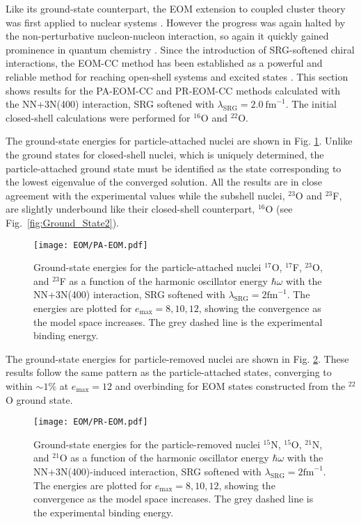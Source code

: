 \documentclass[thesis.tex]{subfiles}
\begin{document}
Like its ground-state counterpart, the EOM extension to coupled cluster theory was first applied to nuclear systems \cite{EMRICH1981379,EMRICH1981397,EMRICH1981439}.  However the progress was again halted by the non-perturbative nucleon-nucleon interaction, so again it quickly gained prominence in quantum chemistry \cite{STANTON1993,SHAVITT2009}.  Since the introduction of SRG-softened chiral interactions, the EOM-CC method has been established as a powerful and reliable method for reaching open-shell systems and excited states \cite{WLOCH2005212501,GOUR2006024310,JANSEN2013,HAGEN2012,EKSTROM2015}.  This section shows results for the PA-EOM-CC and PR-EOM-CC methods calculated with the NN+3N(400) interaction, SRG softened with $\lambda_{\mathrm{SRG}}=2.0\ \mathrm{fm}^{-1}$.  The initial closed-shell calculations were performed for $^{16}$O and $^{22}$O.

The ground-state energies for particle-attached nuclei are shown in Fig. \ref{fig:PA-Nuclei}.  Unlike the ground states for closed-shell nuclei, which is uniquely determined, the particle-attached ground state must be identified as the state corresponding to the lowest eigenvalue of the converged solution.  All the results are in close agreement with the experimental values while the subshell nuclei, $^{23}$O and $^{23}$F, are slightly underbound like their closed-shell counterpart, $^{16}$O (see Fig.\ \ref{fig:Ground_State2}).
\begin{figure}[h]
  \centering
  \texttt{[image: EOM/PA-EOM.pdf]}
  \caption{Ground-state energies for the particle-attached nuclei $^{17}$O, $^{17}$F, $^{23}$O, and $^{23}$F as a function of the harmonic oscillator energy $\hbar\omega$ with the NN+3N(400) interaction, SRG softened with $\lambda_{\mathrm{SRG}}=2\mathrm{fm}^{-1}$.  The energies are plotted for $e_\mathrm{max}=8,10,12$, showing the convergence as the model space increases.  The grey dashed line is the experimental binding energy.}
  \label{fig:PA-Nuclei}
\end{figure}

The ground-state energies for particle-removed nuclei are shown in Fig. \ref{fig:PR-Nuclei}.  These results follow the same pattern as the particle-attached states, converging to within $\sim 1\%$ at $e_{\mathrm{max}}=12$ and overbinding for EOM states constructed from the $^{22}$O ground state.
\begin{figure}[h]
  \centering
  \texttt{[image: EOM/PR-EOM.pdf]}
  \caption{Ground-state energies for the particle-removed nuclei $^{15}$N, $^{15}$O, $^{21}$N, and $^{21}$O as a function of the harmonic oscillator energy $\hbar\omega$ with the NN+3N(400)-induced interaction, SRG softened with $\lambda_{\mathrm{SRG}}=2\mathrm{fm}^{-1}$.  The energies are plotted for $e_\mathrm{max}=8,10,12$, showing the convergence as the model space increases.  The grey dashed line is the experimental binding energy.}
  \label{fig:PR-Nuclei}
\end{figure}
\end{document}
